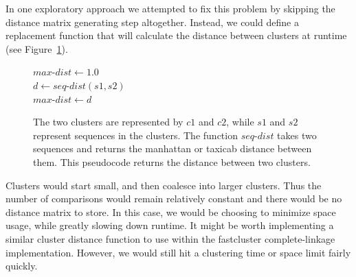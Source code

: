 In one exploratory approach we attempted to fix this problem by skipping the distance matrix generating step altogether.
Instead, we could define a replacement function that will calculate the distance between clusters at runtime (see Figure~\ref{code:LazyClustering}).



\begin{figure}[h!]
\begin{algorithm}[H]
 \SetAlgoLined

\BlankLine
 $max$-$dist \gets 1.0$\\
  {
    {
    $d \gets seq$-$dist(s1, s2)$\\
     {
      $max$-$dist \gets d$
    }
   }
 }
\end{algorithm}
\caption[Pseudocode showing a distance function for two clusters.]{The two clusters are represented by $c1$ and $c2$, while $s1$ and $s2$ represent sequences in the clusters. The function $seq$-$dist$ takes two sequences and returns the manhattan or taxicab distance between them. This pseudocode returns the distance between two clusters.}
\label{code:LazyClustering}
\end{figure}


Clusters would start small, and then coalesce into larger clusters.
Thus the number of comparisons would remain relatively constant and there would be no distance matrix to store.
In this case, we would be choosing to minimize space usage, while greatly slowing down runtime.
It might be worth implementing a similar cluster distance function to use within the fastcluster complete-linkage implementation.
However, we would still hit a clustering time or space limit fairly quickly.

